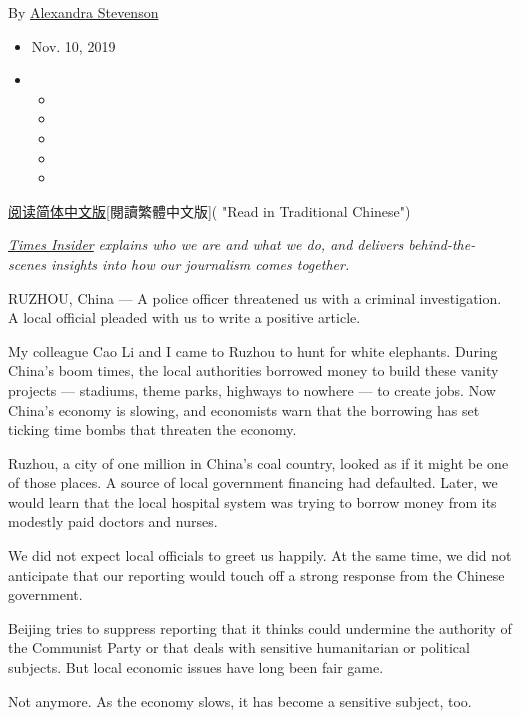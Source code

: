 By
\href{https://www.nytimes3xbfgragh.onion/by/alexandra-stevenson}{Alexandra
Stevenson}

\begin{itemize}
\item
  Nov. 10, 2019
\item
  \begin{itemize}
  \item
  \item
  \item
  \item
  \item
  \end{itemize}
\end{itemize}

\href{https://cn.nytimes3xbfgragh.onion/business/20191111/china-reporter-police/}{阅读简体中文版}{[}閱讀繁體中文版{]}(
"Read in Traditional Chinese")

\href{https://www.nytimes3xbfgragh.onion/series/times-insider}{\emph{Times
Insider}} \emph{explains who we are and what we do, and delivers
behind-the-scenes insights into how our journalism comes together.}

RUZHOU, China --- A police officer threatened us with a criminal
investigation. A local official pleaded with us to write a positive
article.

My colleague Cao Li and I came to Ruzhou to hunt for white elephants.
During China's boom times, the local authorities borrowed money to build
these vanity projects --- stadiums, theme parks, highways to nowhere ---
to create jobs. Now China's economy is slowing, and economists warn that
the borrowing has set ticking time bombs that threaten the economy.

Ruzhou, a city of one million in China's coal country, looked as if it
might be one of those places. A source of local government financing had
defaulted. Later, we would learn that the local hospital system was
trying to borrow money from its modestly paid doctors and nurses.

We did not expect local officials to greet us happily. At the same time,
we did not anticipate that our reporting would touch off a strong
response from the Chinese government.

Beijing tries to suppress reporting that it thinks could undermine the
authority of the Communist Party or that deals with sensitive
humanitarian or political subjects. But local economic issues have long
been fair game.

Not anymore. As the economy slows, it has become a sensitive subject,
too.

